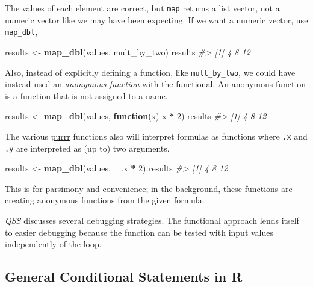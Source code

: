 \documentclass[]{book}
\newenvironment{Shaded}{\begin{snugshade}}{\end{snugshade}}
\newcommand{\KeywordTok}[1]{\textcolor[rgb]{0.13,0.29,0.53}{\textbf{#1}}}
\newcommand{\DecValTok}[1]{\textcolor[rgb]{0.00,0.00,0.81}{#1}}
\newcommand{\StringTok}[1]{\textcolor[rgb]{0.31,0.60,0.02}{#1}}
\newcommand{\CommentTok}[1]{\textcolor[rgb]{0.56,0.35,0.01}{\textit{#1}}}
\newcommand{\ControlFlowTok}[1]{\textcolor[rgb]{0.13,0.29,0.53}{\textbf{#1}}}
\newcommand{\OperatorTok}[1]{\textcolor[rgb]{0.81,0.36,0.00}{\textbf{#1}}}
\newcommand{\NormalTok}[1]{#1}
\theoremstyle{definition}
\theoremstyle{definition}
\theoremstyle{definition}
\theoremstyle{remark}
\begin{document}
The values of each element are correct, but \texttt{map} returns a list
vector, not a numeric vector like we may have been expecting. If we want
a numeric vector, use \texttt{map\_dbl},

\begin{Shaded}
\begin{Highlighting}[]
\NormalTok{results <-}\StringTok{ }\KeywordTok{map_dbl}\NormalTok{(values, mult_by_two)}
\NormalTok{results}
\CommentTok{#> [1]  4  8 12}
\end{Highlighting}
\end{Shaded}

Also, instead of explicitly defining a function, like
\texttt{mult\_by\_two}, we could have instead used an \emph{anonymous
function} with the functional. An anonymous function is a function that
is not assigned to a name.

\begin{Shaded}
\begin{Highlighting}[]
\NormalTok{results <-}\StringTok{ }\KeywordTok{map_dbl}\NormalTok{(values, }\ControlFlowTok{function}\NormalTok{(x) x }\OperatorTok{*}\StringTok{ }\DecValTok{2}\NormalTok{)}
\NormalTok{results}
\CommentTok{#> [1]  4  8 12}
\end{Highlighting}
\end{Shaded}

The various \href{https://cran.r-project.org/package=purrr}{purrr}
functions also will interpret formulas as functions where \texttt{.x}
and \texttt{.y} are interpreted as (up to) two arguments.

\begin{Shaded}
\begin{Highlighting}[]
\NormalTok{results <-}\StringTok{ }\KeywordTok{map_dbl}\NormalTok{(values, }\OperatorTok{~}\StringTok{ }\NormalTok{.x }\OperatorTok{*}\StringTok{ }\DecValTok{2}\NormalTok{)}
\NormalTok{results}
\CommentTok{#> [1]  4  8 12}
\end{Highlighting}
\end{Shaded}

This is for parsimony and convenience; in the background, these
functions are creating anonymous functions from the given formula.

\emph{QSS} discusses several debugging strategies. The functional
approach lends itself to easier debugging because the function can be
tested with input values independently of the loop.

\subsection{General Conditional Statements in
R}\label{general-conditional-statements-in-r}
\end{document}
